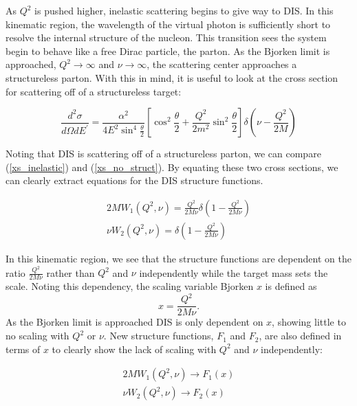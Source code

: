 As $Q^2$ is pushed higher, inelastic scattering begins to give way to DIS. In this kinematic region, the wavelength of the virtual photon is sufficiently short to resolve the internal structure of the nucleon. This transition sees the system begin to behave like a free Dirac particle, the parton. As the Bjorken limit is approached, $Q^2\rightarrow\infty$ and $\nu\rightarrow\infty$, the scattering center approaches a structureless parton.\cite{Bjorken_scaling} With this in mind, it is useful to look at the cross section for scattering off of a structureless target:

\begin{equation}
	\frac{d^2\sigma}{d\Omega dE^\prime} = \frac{\alpha^2}{4E^{2}\sin^{4}\frac{\theta}{2}} \left[\cos^{2}\frac{\theta}{2} + \frac{Q^2}{2m^2}\sin^{2}\frac{\theta}{2}\right] \delta\left(\nu-\frac{Q^2}{2M}\right)
	\label{xs_no_struct}
\end{equation}

Noting that DIS is scattering off of a structureless parton, we can compare (\ref{xs_inelastic}) and (\ref{xs_no_struct}). By equating these two cross sections, we can clearly extract equations for the DIS structure functions.

\begin{subequations}
\begin{align}
	2MW_1\left(Q^{2},\nu\right) = \frac{Q^2}{2M\nu}\delta\left(1-\frac{Q^2}{2M\nu}\right) \\
	\nu W_2\left(Q^{2},\nu\right) = \delta\left(1-\frac{Q^2}{2M\nu}\right)
\end{align}
\end{subequations}

In this kinematic region, we see that the structure functions are dependent on the ratio $\frac{Q^2}{2M\nu}$ rather than $Q^2$ and $\nu$ independently while the target mass sets the scale. Noting this dependency, the scaling variable Bjorken $x$ is defined as
\begin{equation}
	x = \frac{Q^2}{2M\nu}.
\end{equation}
As the Bjorken limit is approached DIS is only dependent on $x$, showing little to no scaling with $Q^2$ or $\nu$.\cite{bodek_scaling} New structure functions, $F_1$ and $F_2$, are also defined in terms of $x$ to clearly show the lack of scaling with $Q^2$ and $\nu$ independently:

\begin{subequations}
\begin{align}
	2MW_1\left(Q^{2},\nu\right) \rightarrow F_{1}\left(x\right) \\
	\nu W_2\left(Q^{2},\nu\right) \rightarrow F_{2}\left(x\right)
\end{align}
\label{eqn:w_to_f}
\end{subequations}

